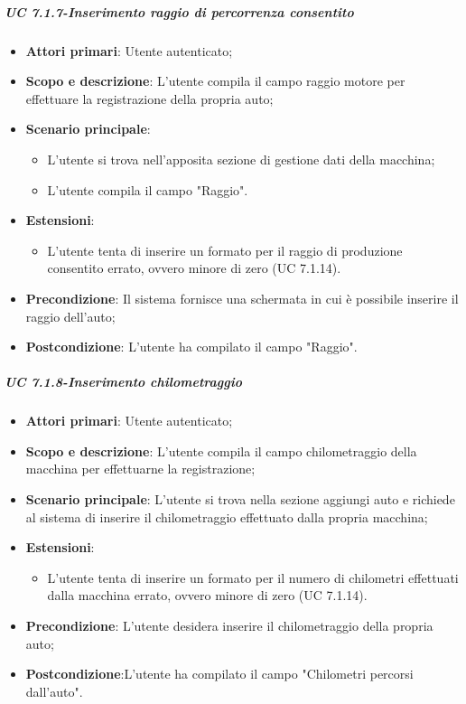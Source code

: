                  \subparagraph{UC 7.1.7-Inserimento raggio di percorrenza consentito}
    \begin{itemize}
                \item \textbf{Attori primari}: Utente autenticato;
                
                 \item \textbf{Scopo e descrizione}: L'utente compila il campo raggio motore per effettuare la registrazione della propria auto;
                 \item \textbf{Scenario principale}:
                 \begin{itemize}
                     \item L'utente si trova nell'apposita sezione di gestione dati della macchina;
                     \item L'utente compila il campo "Raggio".
                 \end{itemize}
                 \item \textbf{Estensioni}:
                 \begin{itemize}
                        \item L'utente tenta di inserire un formato per il raggio di produzione consentito errato, ovvero minore di zero (UC 7.1.14).
                    \end{itemize}
                 \item \textbf{Precondizione}: Il sistema fornisce una schermata in cui è possibile inserire il raggio dell'auto;
                 \item \textbf{Postcondizione}: L'utente ha compilato il campo "Raggio".
                 \end{itemize}
                 
        \subparagraph{UC 7.1.8-Inserimento chilometraggio}
    \begin{itemize}
                \item \textbf{Attori primari}: Utente autenticato;
               
                 \item \textbf{Scopo e descrizione}: L'utente compila il campo chilometraggio della macchina per effettuarne la registrazione;
                 \item \textbf{Scenario principale}: L'utente si trova nella sezione aggiungi auto e richiede al sistema di inserire il chilometraggio effettuato dalla propria macchina;
                 \item \textbf{Estensioni}: 
                 \begin{itemize}
                        \item L'utente tenta di inserire un formato per il numero di chilometri effettuati dalla macchina errato, ovvero minore di zero (UC 7.1.14).
                    \end{itemize}
                 \item \textbf{Precondizione}: L'utente desidera inserire il chilometraggio della propria auto;
                 \item \textbf{Postcondizione}:L’utente ha compilato il campo "Chilometri percorsi dall'auto".
                 \end{itemize}
                 
